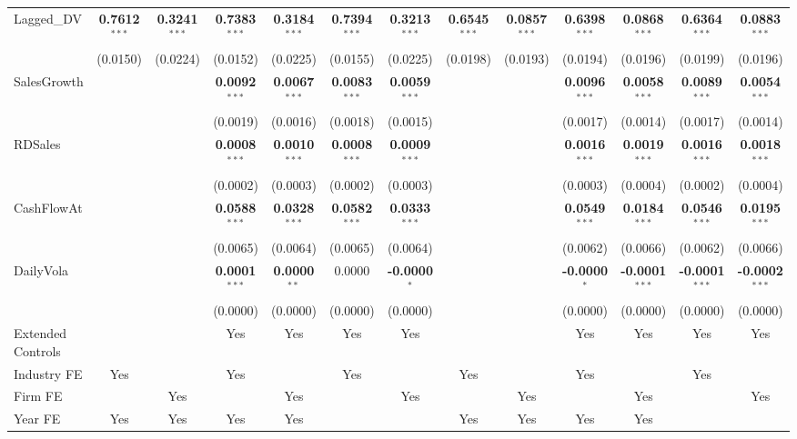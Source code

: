 \documentclass[11pt,a4paper]{article}
\begin{document}
\begin{table}[htbp]
\begin{tabular}{lcccccccccccc}
Lagged\_DV & \textbf{0.7612}$^{***}$ & \textbf{0.3241}$^{***}$ & \textbf{0.7383}$^{***}$ & \textbf{0.3184}$^{***}$ & \textbf{0.7394}$^{***}$ & \textbf{0.3213}$^{***}$ & \textbf{0.6545}$^{***}$ & \textbf{0.0857}$^{***}$ & \textbf{0.6398}$^{***}$ & \textbf{0.0868}$^{***}$ & \textbf{0.6364}$^{***}$ & \textbf{0.0883}$^{***}$ \\
 & (0.0150) & (0.0224) & (0.0152) & (0.0225) & (0.0155) & (0.0225) & (0.0198) & (0.0193) & (0.0194) & (0.0196) & (0.0199) & (0.0196) \\
SalesGrowth &  &  & \textbf{0.0092}$^{***}$ & \textbf{0.0067}$^{***}$ & \textbf{0.0083}$^{***}$ & \textbf{0.0059}$^{***}$ &  &  & \textbf{0.0096}$^{***}$ & \textbf{0.0058}$^{***}$ & \textbf{0.0089}$^{***}$ & \textbf{0.0054}$^{***}$ \\
 &  &  & (0.0019) & (0.0016) & (0.0018) & (0.0015) &  &  & (0.0017) & (0.0014) & (0.0017) & (0.0014) \\
RDSales &  &  & \textbf{0.0008}$^{***}$ & \textbf{0.0010}$^{***}$ & \textbf{0.0008}$^{***}$ & \textbf{0.0009}$^{***}$ &  &  & \textbf{0.0016}$^{***}$ & \textbf{0.0019}$^{***}$ & \textbf{0.0016}$^{***}$ & \textbf{0.0018}$^{***}$ \\
 &  &  & (0.0002) & (0.0003) & (0.0002) & (0.0003) &  &  & (0.0003) & (0.0004) & (0.0002) & (0.0004) \\
CashFlowAt &  &  & \textbf{0.0588}$^{***}$ & \textbf{0.0328}$^{***}$ & \textbf{0.0582}$^{***}$ & \textbf{0.0333}$^{***}$ &  &  & \textbf{0.0549}$^{***}$ & \textbf{0.0184}$^{***}$ & \textbf{0.0546}$^{***}$ & \textbf{0.0195}$^{***}$ \\
 &  &  & (0.0065) & (0.0064) & (0.0065) & (0.0064) &  &  & (0.0062) & (0.0066) & (0.0062) & (0.0066) \\
DailyVola &  &  & \textbf{0.0001}$^{***}$ & \textbf{0.0000}$^{**}$ & 0.0000 & \textbf{-0.0000}$^{*}$ &  &  & \textbf{-0.0000}$^{*}$ & \textbf{-0.0001}$^{***}$ & \textbf{-0.0001}$^{***}$ & \textbf{-0.0002}$^{***}$ \\
 &  &  & (0.0000) & (0.0000) & (0.0000) & (0.0000) &  &  & (0.0000) & (0.0000) & (0.0000) & (0.0000) \\
\midrule
Extended Controls &  &  & Yes & Yes & Yes & Yes &  &  & Yes & Yes & Yes & Yes \\
Industry FE & Yes &  & Yes &  & Yes &  & Yes &  & Yes &  & Yes &  \\
Firm FE &  & Yes &  & Yes &  & Yes &  & Yes &  & Yes &  & Yes \\
Year FE & Yes & Yes & Yes & Yes &  &  & Yes & Yes & Yes & Yes &  &  \\

\end{tabular}
\end{table}
\end{document}
